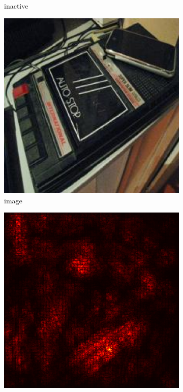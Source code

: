\documentclass[preprint,12pt]{elsarticle}
\begin{document}
\begin{figure}
\begin{subfigure}{0.14\textwidth}
        \caption{inactive}
    \end{subfigure}
    \hfill
    \begin{subfigure}{0.14\linewidth}
        \centering
        \includegraphics[width=\linewidth]{../visualizations/examples/imagenette/cnn/images/2.png}
        \caption{image}
    \end{subfigure}
    \hfill
    \begin{subfigure}{0.14\linewidth}
        \centering
        \includegraphics[width=\linewidth]{../visualizations/examples/imagenette/cnn/saliency_map/2.png}

\end{subfigure}
\end{figure}
\end{document}
